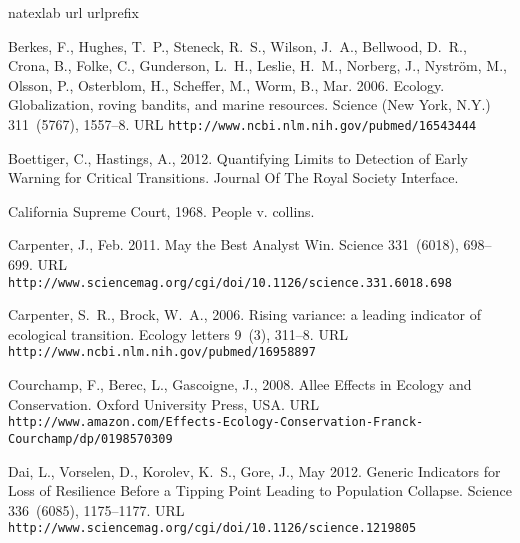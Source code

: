 \documentclass[authoryear,review,12pt]{elsarticle}
\begin{document}
 \begin{thebibliography}{24}
\expandafter\ifx\csname natexlab\endcsname\relax\def\natexlab#1{#1}\fi
\expandafter\ifx\csname url\endcsname\relax
  \def\url#1{\texttt{#1}}\fi
\expandafter\ifx\csname urlprefix\endcsname\relax\def\urlprefix{URL }\fi

Berkes, F., Hughes, T.~P., Steneck, R.~S., Wilson, J.~A., Bellwood, D.~R.,
  Crona, B., Folke, C., Gunderson, L.~H., Leslie, H.~M., Norberg, J.,
  Nystr\"{o}m, M., Olsson, P., Osterblom, H., Scheffer, M., Worm, B., Mar.
  2006. {Ecology. Globalization, roving bandits, and marine resources.} Science
  (New York, N.Y.) 311~(5767), 1557--8.
\newline\urlprefix\url{http://www.ncbi.nlm.nih.gov/pubmed/16543444}

Boettiger, C., Hastings, A., 2012. {Quantifying Limits to Detection of Early
  Warning for Critical Transitions}. Journal Of The Royal Society Interface.

{California Supreme Court}, 1968. People v. collins.

Carpenter, J., Feb. 2011. {May the Best Analyst Win}. Science 331~(6018),
  698--699.
\newline\urlprefix\url{http://www.sciencemag.org/cgi/doi/10.1126/science.331.6018.698}

Carpenter, S.~R., Brock, W.~A., 2006. {Rising variance: a leading indicator of
  ecological transition.} Ecology letters 9~(3), 311--8.
\newline\urlprefix\url{http://www.ncbi.nlm.nih.gov/pubmed/16958897}

Courchamp, F., Berec, L., Gascoigne, J., 2008. {Allee Effects in Ecology and
  Conservation}. Oxford University Press, USA.
\newline\urlprefix\url{http://www.amazon.com/Effects-Ecology-Conservation-Franck-Courchamp/dp/0198570309}

Dai, L., Vorselen, D., Korolev, K.~S., Gore, J., May 2012. {Generic Indicators
  for Loss of Resilience Before a Tipping Point Leading to Population
  Collapse}. Science 336~(6085), 1175--1177.
\newline\urlprefix\url{http://www.sciencemag.org/cgi/doi/10.1126/science.1219805}


\end{thebibliography}
\end{document}
